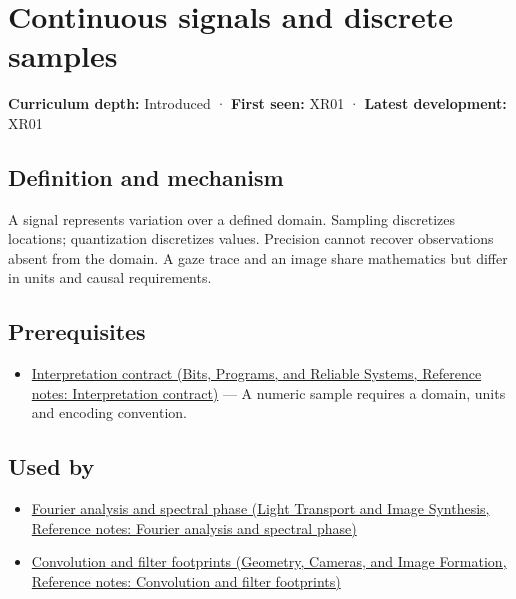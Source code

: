 \hypertarget{appendix-1077ea8fc737}{}\label{referencestart:appendix-1077ea8fc737}
\section{Continuous signals and discrete samples}\label{appendix-1077ea8fc737-continuous-signals-and-discrete-samples}

\textbf{Curriculum depth:} Introduced · \textbf{First seen:} XR01 · \textbf{Latest development:} XR01

\subsection{Definition and mechanism}\label{appendix-1077ea8fc737-definition-and-mechanism}

A signal represents variation over a defined domain. Sampling discretizes locations; quantization discretizes values. Precision cannot recover observations absent from the domain. A gaze trace and an image share mathematics but differ in units and causal requirements.

\subsection{Prerequisites}\label{appendix-1077ea8fc737-prerequisites}

\begin{itemize}
\tightlist
\item
  \href{../01-Bits-Programs-and-Reliable-Systems/main.pdf\#nameddest=appendix-f414bd4ed05c}{Interpretation contract (Bits, Programs, and Reliable Systems, Reference notes: Interpretation contract)} --- A numeric sample requires a domain, units and encoding convention.
\end{itemize}

\subsection{Used by}\label{appendix-1077ea8fc737-used-by}

\begin{itemize}
\tightlist
\item
  \href{../04-Light-Transport-and-Image-Synthesis/main.pdf\#nameddest=appendix-b60686ba06a1}{Fourier analysis and spectral phase (Light Transport and Image Synthesis, Reference notes: Fourier analysis and spectral phase)}
\item
  \href{../03-Geometry-Cameras-and-Image-Formation/main.pdf\#nameddest=appendix-d5b3c692d9f0}{Convolution and filter footprints (Geometry, Cameras, and Image Formation, Reference notes: Convolution and filter footprints)}
\end{itemize}

